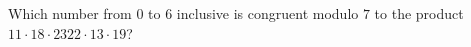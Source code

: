Which number from $0$ to $6$ inclusive is congruent modulo $7$ to the product $11\cdot18\cdot2322\cdot13\cdot19$?
